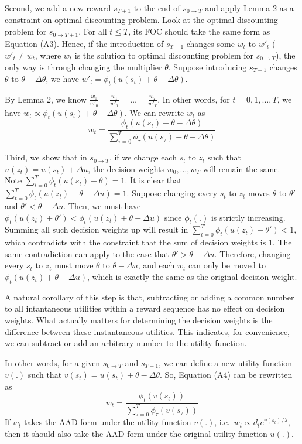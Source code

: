 Second, we add a new reward \(s_{T+1}\) to the end of
\(s_{0\rightarrow T}\) and apply Lemma 2 as a constraint on optimal
discounting problem. Look at the optimal discounting problem for
\(s_{0\rightarrow T+1}\). For all \(t\leq T\), its FOC should take the
same form as Equation (A3). Hence, if the introduction of \(s_{T+1}\)
changes some \(w_t\) to \(w'_t\) (\(w'_t \neq w_t\), where \(w_t\) is
the solution to optimal discounting problem for \(s_{0\rightarrow T}\)),
the only way is through changing the multiplier \(\theta\). Suppose
introducing \(s_{T+1}\) changes \(\theta\) to \(\theta-\Delta \theta\),
we have \(w'_t = \phi_t(u(s_t)+\theta-\Delta \theta)\).

By Lemma 2, we know
\(\frac{w_0}{w'_0}=\frac{w_1}{w'_1}=…=\frac{w_T}{w'_T}\). In other
words, for \(t=0,1,…,T\), we have
\(w_t \propto \phi_t(u(s_t)+\theta-\Delta \theta)\). We can rewrite
\(w_t\) as \[\tag{A4}
w_t = \frac{\phi_t(u(s_t)+\theta-\Delta \theta)}{\sum_{\tau=0}^{T}\phi_\tau(u(s_\tau)+\theta-\Delta \theta)}
\]

Third, we show that in \(s_{0\rightarrow T}\), if we change each \(s_t\)
to \(z_t\) such that \(u(z_t)=u(s_t)+\Delta u\), the decision weights
\(w_0,…,w_T\) will remain the same. Note
\(\sum_{t=0}^T \phi_t(u(s_t)+\theta)=1\). It is clear that
\(\sum_{t=0}^T \phi_t(u(z_t)+\theta-\Delta u)=1\). Suppose changing
every \(s_t\) to \(z_t\) moves \(\theta\) to \(\theta'\) and
\(\theta'<\theta-\Delta u\). Then, we must have
\(\phi_t(u(z_t)+\theta')<\phi_t(u(z_t)+\theta-\Delta u)\) since
\(\phi_t(.)\) is strictly increasing. Summing all such decision weights
up will result in \(\sum_{t=0}^T \phi_t(u(z_t)+\theta')<1\), which
contradicts with the constraint that the sum of decision weights is 1.
The same contradiction can apply to the case that
\(\theta'>\theta-\Delta u\). Therefore, changing every \(s_t\) to
\(z_t\) must move \(\theta\) to \(\theta - \Delta u\), and each \(w_t\)
can only be moved to \(\phi_t(u(z_t)+\theta -\Delta u)\), which is
exactly the same as the original decision weight.

A natural corollary of this step is that, subtracting or adding a common
number to all intantaneous utilities within a reward sequence has no
effect on decision weights. What actually matters for determining the
decision weights is the difference between these instantaneous
utilities. This indicates, for convenience, we can subtract or add an
arbitrary number to the utility function.

In other words, for a given \(s_{0\rightarrow T}\) and \(s_{T+1}\), we
can define a new utility function \(v(.)\) such that
\(v(s_t) = u(s_t) +\theta-\Delta \theta\). So, Equation (A4) can be
rewritten as\[\tag{A5}
w_t = \frac{\phi_t(v(s_t))}{\sum_{\tau=0}^{T}\phi_\tau(v(s_\tau))}
\]If \(w_t\) takes the AAD form under the utility function \(v(.)\),
i.e.~\(w_t \propto d_t e^{v(s_t)/\lambda}\), then it should also take
the AAD form under the original utility function \(u(.)\).

